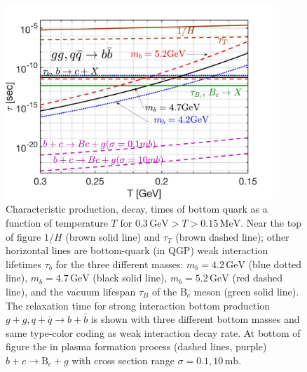 \begin{figure} 
\centerline{\includegraphics[width=0.9\textwidth]{./plots/BQuarkReactionTime003}}
\caption{Characteristic production, decay, times of bottom quark  as a function of  temperature $T$ for $0.3\,\mathrm{GeV}>T> 0.15\,\mathrm{MeV}$.  Near the top of figure  $1/H$ (brown solid line) and $\tau_T$ (brown dashed line); other horizontal lines are bottom-quark (in QGP) weak interaction lifetimes $\tau_b$ for the three different masses: $m_b=4.2\,\mathrm{GeV}$ (blue dotted line), $m_b=4.7\,\mathrm{GeV}$ (black solid  line), $m_b=5.2\,\mathrm{GeV}$ (red dashed line), and the vacuum lifespan $\tau_B$ of the  B$_c$ meson (green solid  line). The relaxation time for strong interaction bottom production $g+g, q+\bar q\rightarrow b+\bar{b}$ is shown with three different bottom masses and same type-color coding as weak interaction decay rate. At bottom of figure the in plasma formation process (dashed lines, purple) $b+c\rightarrow \mathrm{B}_c+g$ with cross section range $\sigma=0.1,10\,\mathrm{mb}$. }
\label{ReactionTime}
\end{figure}

